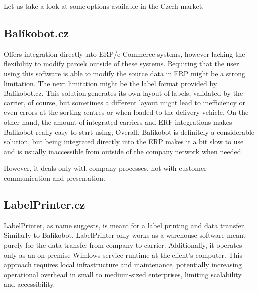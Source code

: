 Let us take a look at some options available in the Czech market.

\subsection{Balíkobot.cz}
\label{subsec:balikobot}
Offers integration directly into \ac{ERP}/e-Commerce systems, however lacking the flexibility to modify parcels outside of these systems.
Requiring that the user using this software is able to modify the source data in \ac{ERP} might be a strong limitation.
The next limitation might be the label format provided by Balíkobot.cz.
This solution generates its own layout of labels, validated by the carrier, of course, but sometimes a different layout might lead to inefficiency or even errors at the sorting centres or when loaded to the delivery vehicle.
On the other hand, the amount of integrated carriers and \ac{ERP} integrations makes Balikobot really easy to start using,
Overall, Balíkobot is definitely a considerable solution, but being integrated directly into the \ac{ERP} makes it a bit slow to use and is usually inaccessible from outside of the company network when needed.

However, it deals only with company processes, not with customer communication and presentation.

\subsection{LabelPrinter.cz}
\label{subsec:labelprinter}
LabelPrinter, as name suggests, is meant for a label printing and data transfer. Similarly to Balíkobot, LabelPrinter only works as a warehouse software meant purely for the data transfer from company to carrier.
Additionally, it operates only as an on-premise Windows service runtime at the client's computer. 
This approach requires local infrastructure and maintenance, potentially increasing operational overhead in small to medium-sized enterprises, limiting scalability and accessibility.


